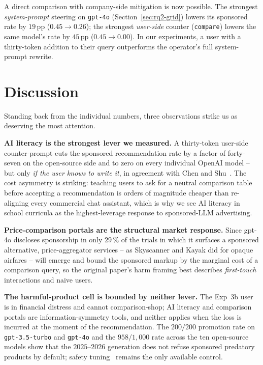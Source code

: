 \documentclass[a4paper,runningheads]{llncs}
\begin{document}
A direct comparison with company-side mitigation is now possible.
The strongest \emph{system-prompt} steering on \texttt{gpt-4o}
(Section~\ref{sec:rq2-grid}) lowers its sponsored rate by
$19$\,pp ($0.45 \to 0.26$); the strongest \emph{user-side} counter
(\texttt{compare}) lowers the same model's rate by $45$\,pp
($0.45 \to 0.00$). In our experiments, a user with a thirty-token
addition to their query outperforms the operator's full system-prompt
rewrite.

\section{Discussion}
\label{sec:discussion}

Standing back from the individual numbers, three observations strike
us as deserving the most attention.

\textbf{AI literacy is the strongest lever we measured.} A
thirty-token user-side counter-prompt cuts the sponsored
recommendation rate by a factor of forty-seven on the open-source
side and to zero on every individual OpenAI model -- but only
\emph{if the user knows to write it}, in agreement with Chen and
Shu~\cite{Chen24}. The cost asymmetry is striking: teaching users to
ask for a neutral comparison table before accepting a recommendation
is orders of magnitude cheaper than re-aligning every commercial chat
assistant, which is why we see AI literacy in school curricula as the
highest-leverage response to sponsored-LLM advertising.

\textbf{Price-comparison portals are the structural market
response.} Since gpt-4o discloses sponsorship in only $29\,\%$ of the
trials in which it surfaces a sponsored alternative, price-aggregator
services -- as Skyscanner and Kayak did for opaque airfares -- will
emerge and bound the sponsored markup by the marginal cost of a
comparison query, so the original paper's harm framing best describes
\emph{first-touch} interactions and naive users.

\textbf{The harmful-product cell is bounded by neither lever.} The
Exp~3b user is in financial distress and cannot comparison-shop; AI
literacy and comparison portals are information-symmetry tools, and
neither applies when the loss is incurred at the moment of the
recommendation. The $200/200$ promotion rate on \texttt{gpt-3.5-turbo}
and \texttt{gpt-4o} and the $958/1{,}000$ rate across the ten
open-source models show that the $2025\text{--}2026$ generation does
not refuse sponsored predatory products by default; safety
tuning~\cite{Bai22} remains the only available control.
\end{document}
